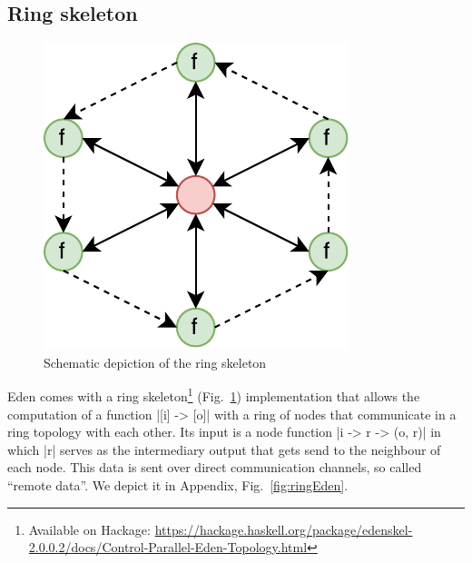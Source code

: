 \subsection{Ring skeleton} \label{sec:ring}
\begin{figure}[h]
	\includegraphics[scale=0.75]{images/ring}
	\caption{Schematic depiction of the ring skeleton}
	\label{fig:ringImg}
\end{figure}
Eden comes with a ring skeleton\footnote{Available on Hackage: \url{https://hackage.haskell.org/package/edenskel-2.0.0.2/docs/Control-Parallel-Eden-Topology.html}} (Fig.~\ref{fig:ringImg}) implementation that allows the computation of a function |[i] -> [o]| with a ring of nodes that communicate in a ring topology with each other. Its input is a node function |i -> r -> (o, r)| in which |r| serves as the intermediary output that gets send to the neighbour of each node. This data is sent over direct communication channels, so called \enquote{remote data}. We depict it in Appendix, Fig.~\ref{fig:ringEden}.


